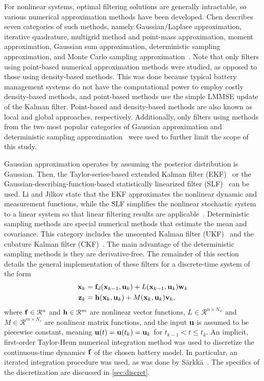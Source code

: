 \documentclass[../zhang_thesis.tex]{subfiles}
\begin{document}
For nonlinear systems, optimal filtering solutions are generally intractable, so various numerical approximation methods have been developed. Chen describes seven categories of such methods, namely Gaussian/Laplace approximation, iterative quadrature, multigrid method and point-mass approximation, moment approximation, Gaussian sum approximation, deterministic sampling approximation, and Monte Carlo sampling approximation~\cite{chen03}. Note that only filters using point-based
numerical approximation methods were studied, as opposed to those using density-based methods. This was done because typical battery management systems do not have the computational power to employ costly density-based methods, and point-based methods use the simple LMMSE update of the Kalman filter. Point-based and density-based methods are also known as local and global approaches, respectively. Additionally, only filters using methods from the two most popular categories of Gaussian
approximation and deterministic sampling approximation~\cite{li04} were used to further limit the scope of this study.

Gaussian approximation operates by assuming the posterior distribution is Gaussian. Then, the Taylor-series-based extended Kalman filter (EKF)~\cite{jazwinski70} or the Gaussian-describing-function-based statistically linearized filter (SLF)~\cite{gelb74} can be used. Li and Jilkov state that the EKF approximates the nonlinear dynamic and measurement functions, while the SLF simplifies the nonlinear stochastic system to a linear system so that linear filtering results are
applicable~\cite{li04}. Deterministic sampling methods are special numerical methods that estimate the mean and covariance. This category includes the unscented Kalman filter (UKF)~\cite{julier97} and the cubature Kalman filter (CKF)~\cite{arasaratnam10}. The main advantage of the deterministic sampling methods is they are derivative-free. The remainder of this section details the general implementation of these filters for a discrete-time system of the form
\begin{align}
    \mathbf{x}_k &= \mathbf{f}_d(\mathbf{x}_{k-1},\mathbf{u}_k) + L(\mathbf{x}_{k-1},\mathbf{u}_k) \mathbf{w}_k \label{eq:dtsys_x} \\
    \mathbf{z}_k &= \mathbf{h}(\mathbf{x}_k,\mathbf{u}_k) + M(\mathbf{x}_k,\mathbf{u}_k) \mathbf{v}_k, \label{eq:dtsys_z}
\end{align}
where $\mathbf{f}\in\mathcal{R}^n$ and $\mathbf{h}\in\mathcal{R}^m$ are nonlinear vector functions, $L\in\mathcal{R}^{n\times N_w}$ and $M\in\mathcal{R}^{m\times N_v}$ are nonlinear matrix functions, and the input $\mathbf{u}$ is assumed to be piecewise constant, meaning $\mathbf{u}(t)=\mathbf{u}(t_k)=\mathbf{u}_k$ for $t_{k-1}<t\le t_k$. An implicit, first-order Taylor-Heun numerical integration method was used to discretize the continuous-time dynamics $\mathbf{f}$ of the chosen battery model. In particular, an iterated integration
procedure was used, as was done by S\"arkk\"a~\cite{sarkka12}. The specifics of the discretization are discussed in \cref{sec:discret}.
\end{document}

